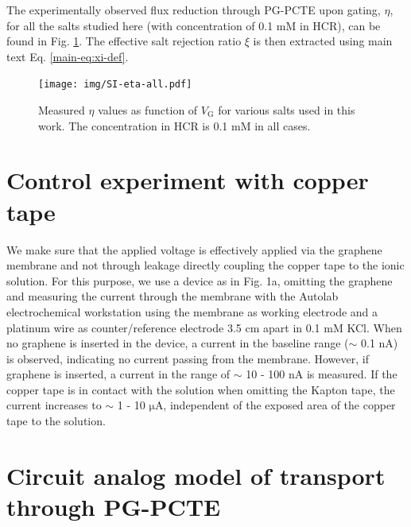 \documentclass[manuscript=suppinfo,email=true, hyperref=true, keywords=false]{achemso}
\newcommand{\Fig}{Fig.}
\begin{document}
The experimentally observed flux reduction through PG-PCTE upon
gating, $\eta$, for all the salts studied here (with concentration of
0.1 mM in HCR), can be found in \Fig{} \ref{fig:eta-all}. The effective salt
rejection ratio $\xi$ is then extracted using main text
Eq. \ref{main-eq:xi-def}.

\begin{figure}[htbp]
  \centering
  \texttt{[image: img/SI-eta-all.pdf]}
  \caption{Measured $\eta$ values as function of $V_{\mathrm{G}}$ for
    various salts used in this work. The concentration in HCR is 0.1
    mM in all cases.}
  \label{fig:eta-all}
\end{figure}


\section{Control experiment with copper tape}
\label{sec:copper}
We make sure that the applied voltage is effectively applied via the
graphene membrane and not through leakage directly coupling the
copper tape to the ionic solution. For this purpose, we use a device as in \Fig
1a, omitting the graphene and measuring the current through the
membrane with the Autolab electrochemical workstation using the
membrane as working electrode and a platinum wire as counter/reference
electrode 3.5 cm apart in 0.1 mM KCl. When no graphene is inserted in
the device, a current in the baseline range ($\sim$ 0.1 nA) is
observed, indicating no current passing from the membrane. However, if
graphene is inserted, a current in the range of $\sim$ 10 - 100 nA is
measured. If the copper tape is in contact with the solution when
omitting the Kapton tape, the current increases to $\sim$ 1 - 10
$\mathrm{\mu}$A, independent of the exposed area of the copper tape to
the solution.


\section{Circuit analog model of transport through PG-PCTE}
\label{sec:R-model}
\end{document}
